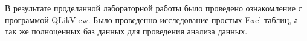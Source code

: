 \Conclusion %

В результате проделанной лабораторной работы было проведено ознакомление
с программой QLikView. Было проведенно исследование простых Exel-таблиц,
а так же полноценных баз данных для проведения анализа данных.

